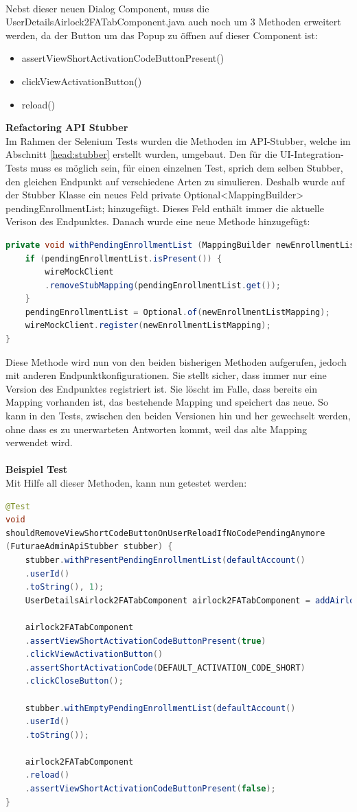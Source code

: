 \\
Nebst dieser neuen Dialog Component, muss die UserDetailsAirlock2FATabComponent.java auch noch um 3 Methoden erweitert werden, da der Button um das Popup zu öffnen auf dieser Component ist:
\begin{itemize}
	\item assertViewShortActivationCodeButtonPresent()
	\item clickViewActivationButton()
	\item reload()
\end{itemize}
\textbf{Refactoring API Stubber}\\
Im Rahmen der Selenium Tests wurden die Methoden im API-Stubber, welche im Abschnitt \ref{head:stubber} erstellt wurden, umgebaut. Den für die UI-Integration-Tests muss es möglich sein, für einen einzelnen Test, sprich dem selben Stubber, den gleichen Endpunkt auf verschiedene Arten zu simulieren. Deshalb wurde auf der Stubber Klasse ein neues Feld \flqq private Optional<MappingBuilder> pendingEnrollmentList; \frqq{} hinzugefügt. Dieses Feld enthält immer die aktuelle Verison des Endpunktes. Danach wurde eine neue Methode hinzugefügt: 
\begin{lstlisting}[language=Java]
private void withPendingEnrollmentList (MappingBuilder newEnrollmentListMapping) {
	if (pendingEnrollmentList.isPresent()) {
		wireMockClient
		.removeStubMapping(pendingEnrollmentList.get());
	}
	pendingEnrollmentList = Optional.of(newEnrollmentListMapping);
	wireMockClient.register(newEnrollmentListMapping);
}
\end{lstlisting}
Diese Methode wird nun von den beiden bisherigen Methoden aufgerufen, jedoch mit anderen Endpunktkonfigurationen. Sie stellt sicher, dass immer nur eine Version des Endpunktes registriert ist. Sie löscht im Falle, dass bereits ein Mapping vorhanden ist, das bestehende Mapping und speichert das neue. So kann in den Tests, zwischen den beiden Versionen hin und her gewechselt werden, ohne dass es zu unerwarteten Antworten kommt, weil das alte Mapping verwendet wird.
\\
\\
\textbf{Beispiel Test}\\
Mit Hilfe all dieser Methoden, kann nun getestet werden:
\begin{lstlisting}[language=Java]
@Test
void 
shouldRemoveViewShortCodeButtonOnUserReloadIfNoCodePendingAnymore 
(FuturaeAdminApiStubber stubber) {
	stubber.withPresentPendingEnrollmentList(defaultAccount()
	.userId()
	.toString(), 1);
	UserDetailsAirlock2FATabComponent airlock2FATabComponent = addAirlock2FA();
	
	airlock2FATabComponent
	.assertViewShortActivationCodeButtonPresent(true)
	.clickViewActivationButton()
	.assertShortActivationCode(DEFAULT_ACTIVATION_CODE_SHORT)
	.clickCloseButton();
	
	stubber.withEmptyPendingEnrollmentList(defaultAccount()
	.userId()
	.toString());
	
	airlock2FATabComponent
	.reload()
	.assertViewShortActivationCodeButtonPresent(false);
}
\end{lstlisting}
